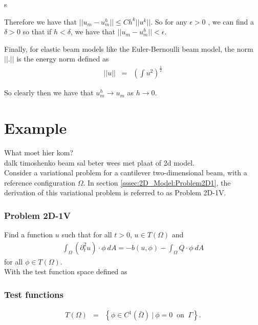 s\documentclass[../../main.tex]{subfiles}
\begin{document}
Therefore we have that $||u_{m} -  u_{m}^{h}|| \leq Ch^{k}||u^{k}||$. So for any $\epsilon >0$ , we can find a $\delta >0$ so that if $h < \delta$, we have that $||u_{m} -  u_{m}^{h}|| < \epsilon$.

Finally, for elastic beam models like the Euler-Bernoulli beam model, the norm $||.||$ is the energy norm defined as
\begin{eqnarray*}
||u|| &=& \left(\int u^{2}\right)^{\frac{1}{2}}
\end{eqnarray*}


So clearly then we have that $u_{m}^{h} \rightarrow u_{m}$ as $h \rightarrow 0$.

\section{Example}
What moet hier kom?\\

dalk timoshenko beam sal beter wees met plaat of 2d model.\\

Consider a variational problem for a cantilever two-dimensional beam, with a reference configuration $\Omega$. In section \ref{sssec:2D_Model:Problem2D1}, the derivation of this variational problem is referred to as Problem 2D-1V.

\subsubsection{Problem 2D-1V}\label{sssec:2D_Model:Problem2D1V}
Find a function $u$ such that for all $t>0$, $u \in T(\Omega)$ and 
\begin{align}
	\int_{\Omega} (\partial_t^2 u)\cdot \phi \ dA = -b(u,\phi) - \int_{\Omega} Q\cdot\phi \ dA \label{eq:2D_Model:Problem2D1VEq}
\end{align}
for all $\phi \in T(\Omega)$.\\

With the test function space defined as
\subsubsection{Test functions}
\begin{eqnarray*}
	T(\Omega) & = & \left\{ \phi \in C^1(\bar{\Omega}) \ | \ \phi = 0 \ \textrm{ on } \ \Gamma \right\}.
\end{eqnarray*}
\end{document}
